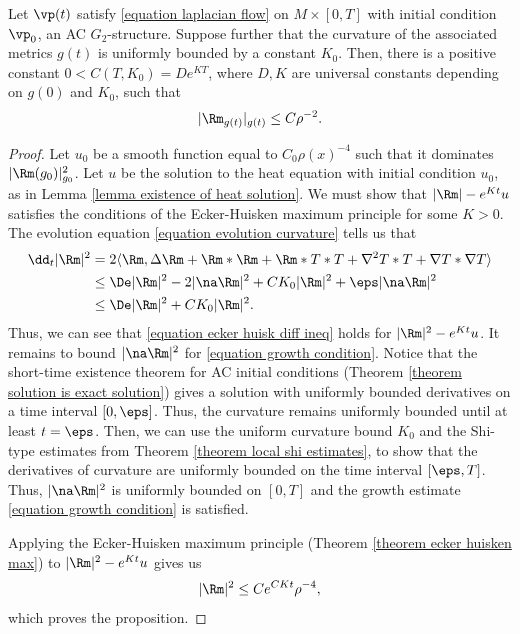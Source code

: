 \documentclass[hidelinks, 12pt, oneside, reqno]{amsart}
\begin{document}
\begin{prop}\label{proposition curvature quadratic decay}
Let $\vp(t)$ satisfy \eqref{equation laplacian flow} on $M \times [0,T]$ with initial condition $\vp_0$, an AC $G_2$-structure. Suppose further that the curvature of the associated metrics $g(t)$ is uniformly bounded by a constant $K_0$. Then, there is a positive constant $0 < C(T,K_0) = De^{KT}$, where $D,K$ are universal constants depending on $g(0)$ and $K_0$, such that 
\[
|\Rm_{g(t)}|_{g(t)} \le C \rho^{-2}. 
\]
\end{prop}

\begin{proof}
Let $u_0$ be a smooth function equal to $C_0\rho(x)^{-4}$ such that it dominates $|\Rm(g_0)|_{g_0}^2$. Let $u$ be the solution to the heat equation with initial condition $u_0$, as in Lemma \ref{lemma existence of heat solution}. We must show that $|\Rm| - e^{Kt}u$ satisfies the conditions of the Ecker-Huisken maximum principle for some $K >0$. The evolution equation \eqref{equation evolution curvature} tells us that
\begin{align*}
\dd_t |\Rm|^2 &= 2 \langle \Rm , \Delta \Rm + \Rm * \Rm + \Rm * T * T + \nabla^2 T * T + \nabla T * \nabla T \rangle \\
&\le \De|\Rm|^2 - 2|\na \Rm|^2 + CK_0 |\Rm|^2 +  \eps |\na \Rm|^2 \\
&\le \De|\Rm|^2  + CK_0 |\Rm|^2.
\end{align*}
Thus, we can see that \eqref{equation ecker huisk diff ineq} holds for $|\Rm|^2 - e^{Kt}u$. It remains to bound $|\na \Rm|^2$ for \eqref{equation growth condition}. Notice that the short-time existence theorem for AC initial conditions (Theorem \ref{theorem solution is exact solution}) gives a solution with uniformly bounded derivatives on a time interval $[0,\eps]$. Thus, the curvature remains uniformly bounded until at least $t = \eps$. Then, we can use the uniform curvature bound $K_0$ and the Shi-type estimates from Theorem \ref{theorem local shi estimates}, to show that the derivatives of curvature are uniformly bounded on the time interval $[\eps, T]$. Thus, $|\na \Rm|^2$ is uniformly bounded on $[0,T]$ and the growth estimate \eqref{equation growth condition} is satisfied.  

Applying the Ecker-Huisken maximum principle (Theorem \ref{theorem ecker huisken max}) to $|\Rm|^2 - e^{Kt}u$ gives us
\[
|\Rm|^2 \le Ce^{CKt}\rho^{-4}, 
\]
which proves the proposition.
\end{proof}
\end{document}
